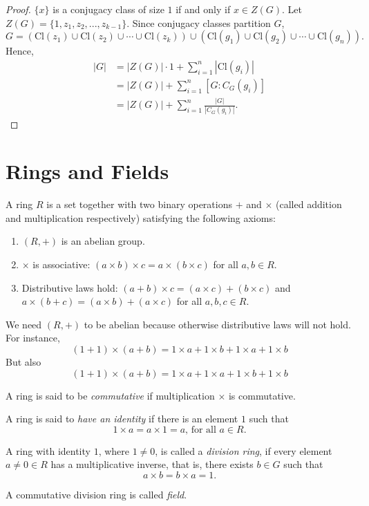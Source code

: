 \begin{proof}
    $\{x\}$ is a conjugacy class of size $1$ if and only if $x \in Z(G)$. Let $Z(G) = \{1, z_1, z_2, ..., z_{k-1}\}$. Since conjugacy classes partition $G$, 
    \[G = (\text{Cl}(z_1) \cup \text{Cl}(z_2) \cup \cdots \cup \text{Cl}(z_k)) \cup (\text{Cl}(g_1) \cup \text{Cl}(g_2) \cup \cdots \cup \text{Cl}(g_n)).\]
    Hence,
    \begin{align*}
        |G| &= |Z(G)| \cdot 1 + \sum_{i=1}^{n}|\text{Cl}(g_i)|\\
            &= |Z(G)| + \sum_{i=1}^{n}[G:C_G(g_i)]\\
            &= |Z(G)| + \sum_{i=1}^{n}\frac{|G|}{|C_G(g_i)|}.
    \end{align*}
\end{proof}
\section{Rings and Fields}
\begin{definition}[Ring]
    A ring $R$ is a set together with two binary operations $+$ and $\times$ (called addition and multiplication respectively) satisfying the following axioms:
    \begin{enumerate}
        \item $(R, +)$ is an abelian group.
        \item $\times$ is associative: $(a \times b) \times c = a \times (b \times c)$ for all $a, b \in R$.
        \item Distributive laws hold: $(a + b) \times c = (a \times c) + (b 
        \times c)$ and $a \times (b + c) = (a \times b) + (a 
        \times c)$ for all $a, b, c \in R$.
    \end{enumerate}
\end{definition}
\begin{remark}
    We need $(R, +)$ to be abelian because otherwise distributive laws will not hold. For instance,
    \[(1+1) \times (a+b) = 1 \times a + 1 \times b + 1 \times a + 1 \times b\]
    But also \[(1+1) \times (a+b) = 1\times a + 1\times a +1 \times b +1 \times b\]
\end{remark}
\begin{definition}
    A ring is said to be \textit{commutative} if multiplication $\times$ is commutative.
\end{definition}
\begin{definition}
    A ring is said to \textit{have an identity} if there is an element $1$ such that 
    \[ 1 \times a = a \times 1 = a \text{, for all } a \in R.\]
\end{definition}
\begin{definition}
    A ring with identity $1$, where $1 \neq 0$, is called a \textit{division ring}, if every element $a \neq 0 \in R$ has a multiplicative inverse, that is, there exists $b \in G$ such that
    \[a \times b = b \times a = 1.\] 
\end{definition}
\begin{definition}[Field]
    A commutative division ring is called \textit{field}.
\end{definition}
